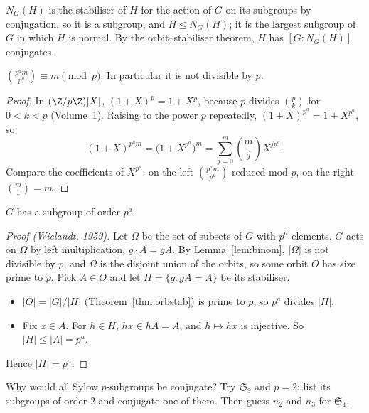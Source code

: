$N_G(H)$ is the stabiliser of $H$ for the action of $G$ on its subgroups by conjugation, so it is a subgroup, and $H\trianglelefteq N_G(H)$; it is the largest subgroup of $G$ in which $H$ is normal. By the orbit--stabiliser theorem, $H$ has $[G:N_G(H)]$ conjugates.

\begin{lemma}\label{lem:binom}
$\binom{p^am}{p^a}\equiv m\pmod p$. In particular it is not divisible by $p$.
\end{lemma}
\begin{proof}
In $(\Z/p\Z)[X]$, $(1+X)^p=1+X^p$, because $p$ divides $\binom pk$ for $0<k<p$ (Volume~1). Raising to the power $p$ repeatedly, $(1+X)^{p^a}=1+X^{p^a}$, so
\[
(1+X)^{p^am}=\bigl(1+X^{p^a}\bigr)^m=\sum_{j=0}^m\binom mjX^{jp^a}.
\]
Compare the coefficients of $X^{p^a}$: on the left $\binom{p^am}{p^a}$ reduced mod $p$, on the right $\binom m1=m$.
\end{proof}

\begin{theorem}[Sylow I]\label{thm:sylow1}
$G$ has a subgroup of order $p^a$.
\end{theorem}
\begin{proof}[Proof (Wielandt, 1959)]
Let $\Omega$ be the set of subsets of $G$ with $p^a$ elements. $G$ acts on $\Omega$ by left multiplication, $g\cdot A=gA$. By Lemma~\ref{lem:binom}, $|\Omega|$ is not divisible by $p$, and $\Omega$ is the disjoint union of the orbits, so some orbit $O$ has size prime to $p$. Pick $A\in O$ and let $H=\{g:gA=A\}$ be its stabiliser.
\begin{itemize}
\item $|O|=|G|/|H|$ (Theorem~\ref{thm:orbstab}) is prime to $p$, so $p^a$ divides $|H|$.
\item Fix $x\in A$. For $h\in H$, $hx\in hA=A$, and $h\mapsto hx$ is injective. So $|H|\le|A|=p^a$.
\end{itemize}
Hence $|H|=p^a$.
\end{proof}

\begin{think}
Why would all Sylow $p$-subgroups be conjugate? Try $\mathfrak S_3$ and $p=2$: list its subgroups of order $2$ and conjugate one of them. Then guess $n_2$ and $n_3$ for $\mathfrak S_4$.
\end{think}

